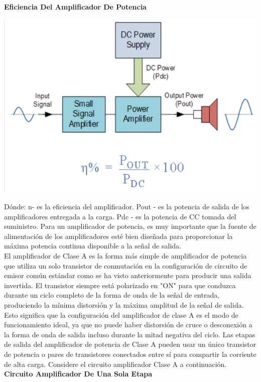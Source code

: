 \documentclass[10pt,a4paper]{article}
\begin{document}
\textbf{Eficiencia Del Amplificador De Potencia}\\
\begin{center}
\includegraphics[scale=0.3]{img1.png} 
\end{center}
Dónde:
n- es la eficiencia del amplificador.
Pout - es la potencia de salida de los amplificadores entregada a la carga.
Pdc - es la potencia de CC tomada del suministro.
Para un amplificador de potencia, es muy importante que la fuente de alimentación de los amplificadores esté bien diseñada para proporcionar la máxima potencia continua disponible a la señal de salida.\\
\newpage
El amplificador de Clase A es la forma más simple de amplificador de potencia que utiliza un solo transistor de conmutación en la configuración de circuito de emisor común estándar como se ha visto anteriormente para producir una salida invertida. El transistor siempre está polarizado en "ON" para que conduzca durante un ciclo completo de la forma de onda de la señal de entrada, produciendo la mínima distorsión y la máxima amplitud de la señal de salida.\\
Esto significa que la configuración del amplificador de clase A es el modo de funcionamiento ideal, ya que no puede haber distorsión de cruce o desconexión a la forma de onda de salida incluso durante la mitad negativa del ciclo. Las etapas de salida del amplificador de potencia de Clase A pueden usar un único transistor de potencia o pares de transistores conectados entre sí para compartir la corriente de alta carga. Considere el circuito amplificador Clase A a continuación.\\
\textbf{Circuito Amplificador De Una Sola Etapa}\\
\end{document}
